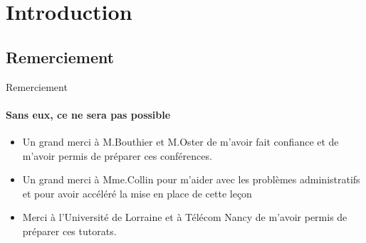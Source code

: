 \section{Introduction}

\subsection{Remerciement}
\begin{frame}{Remerciement}
	\framesubtitle{Sans eux, ce ne sera pas possible}
	\begin{itemize}
		\item Un grand merci à M.Bouthier et M.Oster de m'avoir fait confiance et de m'avoir permis de préparer ces conférences.
		\item Un grand merci à Mme.Collin pour m'aider avec les problèmes administratifs et pour avoir accéléré la mise en place de cette leçon
		\item Merci à l'Université de Lorraine et à Télécom Nancy de m'avoir permis de préparer ces tutorats.
	\end{itemize}
\end{frame}

